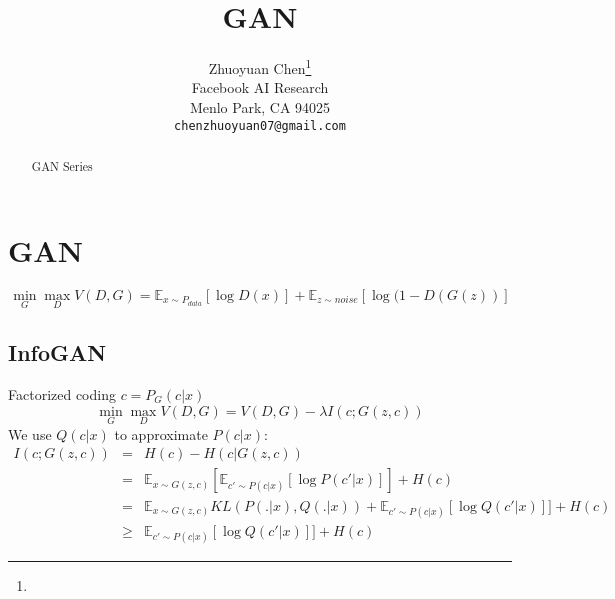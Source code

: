 \documentclass{article}
\title{GAN}
\author{%
  Zhuoyuan Chen\thanks{}\\%
  Facebook AI Research\\
  Menlo Park, CA 94025 \\
  \texttt{chenzhuoyuan07@gmail.com} \\
}
\begin{document}

\maketitle

\begin{abstract}
GAN Series
\end{abstract}

\section{GAN}
\begin{equation}
\min_G\max_D V(D, G) = \mathbb{E}_{x\sim P_{data}}[\log D(x)]+\mathbb{E}_{z\sim noise}[\log (1-D(G(z))]
\end{equation}

\subsection{InfoGAN}
Factorized coding $c=P_G(c|x)$
\begin{equation}
\min_G\max_D V(D, G) = V(D, G) -\lambda I(c;G(z,c))
\end{equation}
We use $Q(c|x)$ to approximate $P(c|x)$:
\begin{eqnarray*}
I(c; G(z,c)) &=& H(c) - H(c|G(z,c))\\
&=& \mathbb{E}_{x\sim G(z,c)}[\mathbb{E}_{c'\sim P(c|x)}[\log P(c'|x)]] + H(c)\\
&=& \mathbb{E}_{x\sim G(z,c)}KL(P(.|x), Q(.|x)) + \mathbb{E}_{c'\sim P(c|x)}[\log Q(c'|x)]] + H(c)\\
&\ge& \mathbb{E}_{c'\sim P(c|x)}[\log Q(c'|x)]] + H(c)
\end{eqnarray*}
\end{document}

